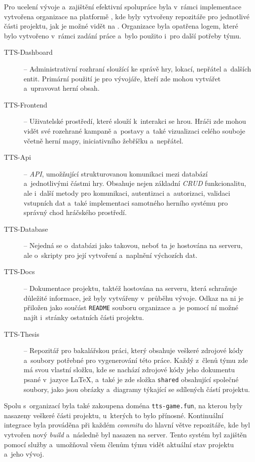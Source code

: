 Pro ucelení vývoje a~zajištění efektivní spolupráce byla v~rámci implementace vytvořena organizace  na platformě , kde byly vytvořeny repozitáře pro jednotlivé části projektu, jak je možné vidět na . Organizace byla opatřena logem, které bylo vytvořeno v~rámci zadání práce a~bylo použito i~pro další potřeby týmu.

\begin{description}
    \item [TTS-Dashboard] -- Administrativní rozhraní sloužící ke správě hry, lokací, nepřátel a~dalších entit. Primární použití je pro vývojáře, kteří zde mohou vytvářet a~upravovat herní obsah.
    \item [TTS-Frontend] -- Uživatelské prostředí, které slouží k~interakci se hrou. Hráči zde mohou vidět své rozehrané kampaně a~postavy a~také vizualizaci celého souboje včetně herní mapy, iniciativního žebříčku a~nepřátel.
    \item [TTS-Api] -- \textit{API}, umožňující strukturovanou komunikaci mezi databází a~jednotlivými částmi hry. Obsahuje nejen základní \textit{CRUD} funkcionalitu, ale i~další metody pro komunikaci, autentizaci a~autorizaci, validaci vstupních dat a~také implementaci samotného herního systému pro správný chod hráčského prostředí.
    \item [TTS-Database] -- Nejedná se o~databázi jako takovou, neboť ta je hostována na serveru, ale o~skripty pro její vytvoření a~naplnění výchozích dat.
    \item [TTS-Docs] -- Dokumentace projektu, taktéž hostována na serveru, která schraňuje důležité informace, jež byly vytvářeny v~průběhu vývoje. Odkaz na ni je přiložen jako součást \texttt{README} souboru organizace a~je pomocí ní možné najít i~stránky ostatních části projektu.
    \item [TTS-Thesis] -- Repozitář pro bakalářskou práci, který obsahuje veškeré zdrojové kódy a~soubory potřebné pro vygenerování této práce. Každý z~členů týmu zde má svou vlastní složku, kde se nachází zdrojové kódy jeho dokumentu psané v~jazyce \LaTeX, a~také je zde složka \texttt{shared} obsahující společné soubory, jako jsou obrázky a~diagramy týkající se sdílených částí projektu.
\end{description}

Spolu s~organizací byla také zakoupena doména \texttt{tts-game.fun}, na kterou byly nasazeny veškeré části projektu, u~kterých to bylo přínosné. Kontinuální integrace byla prováděna při každém \textit{commitu} do hlavní větve repozitáře, kde byl vytvořen nový \textit{build} a~následně byl nasazen na server. Tento systém byl zajištěn pomocí služby  a~umožňoval všem členům týmu vidět aktuální stav projektu a~jeho vývoj.

